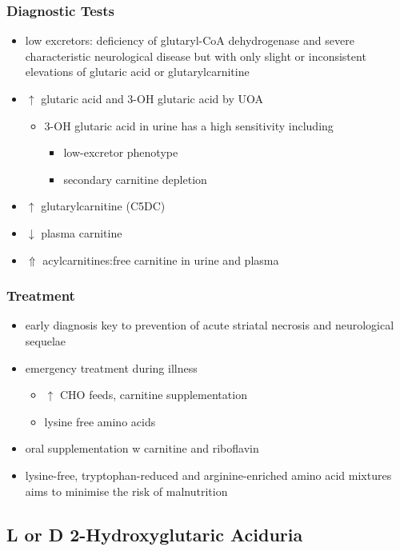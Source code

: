 \documentclass{scrartcl}
\begin{document}
\subsubsection{Diagnostic Tests}
\label{sec:org498d32a}
\begin{itemize}
\item low excretors: deficiency of glutaryl-CoA dehydrogenase and severe
characteristic neurological disease but with only slight or
inconsistent elevations of glutaric acid or glutarylcarnitine
\item \(\uparrow\) glutaric acid and 3-OH glutaric acid by UOA
\begin{itemize}
\item 3-OH glutaric acid in urine has a high sensitivity including
\begin{itemize}
\item low-excretor phenotype
\item secondary carnitine depletion
\end{itemize}
\end{itemize}
\item \(\uparrow\) glutarylcarnitine (C5DC)
\item \(\downarrow\) plasma carnitine
\item \(\Uparrow\) acylcarnitines:free carnitine in urine and plasma
\end{itemize}

\subsubsection{Treatment}
\label{sec:org57bd38f}
\begin{itemize}
\item early diagnosis key to prevention of acute striatal necrosis and
neurological sequelae
\item emergency treatment during illness
\begin{itemize}
\item \(\uparrow\) CHO feeds, carnitine supplementation
\item lysine free amino acids
\end{itemize}
\item oral supplementation w carnitine and riboflavin
\item lysine-free, tryptophan-reduced and arginine-enriched amino acid
mixtures aims to minimise the risk of malnutrition
\end{itemize}

\subsection{L or D 2-Hydroxyglutaric Aciduria}
\label{sec:orge395464}
\end{document}

